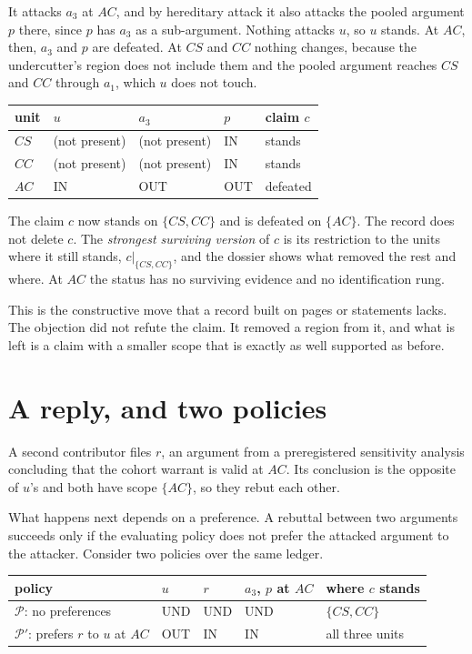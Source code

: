 \documentclass[11pt]{article}
\newcommand{\IN}{\textsf{IN}}
\newcommand{\OUT}{\textsf{OUT}}
\newcommand{\UND}{\textsf{UND}}
\begin{document}
It attacks $a_3$ at $AC$, and by hereditary attack it also attacks the pooled argument $p$ there, since $p$ has $a_3$ as a sub-argument. Nothing attacks $u$, so $u$ stands. At $AC$, then, $a_3$ and $p$ are defeated. At $CS$ and $CC$ nothing changes, because the undercutter's region does not include them and the pooled argument reaches $CS$ and $CC$ through $a_1$, which $u$ does not touch.

\begin{center}
\small
\begin{tabular}{@{}l l l l l@{}}
\toprule
unit & $u$ & $a_3$ & $p$ & claim $c$\\
\midrule
$CS$ & (not present) & (not present) & \IN & stands\\
$CC$ & (not present) & (not present) & \IN & stands\\
$AC$ & \IN & \OUT & \OUT & defeated\\
\bottomrule
\end{tabular}
\end{center}

The claim $c$ now stands on $\{CS,CC\}$ and is defeated on $\{AC\}$. The record does not delete $c$. The \emph{strongest surviving version} of $c$ is its restriction to the units where it still stands, $c|_{\{CS,CC\}}$, and the dossier shows what removed the rest and where. At $AC$ the status has no surviving evidence and no identification rung.

This is the constructive move that a record built on pages or statements lacks. The objection did not refute the claim. It removed a region from it, and what is left is a claim with a smaller scope that is exactly as well supported as before.

\section{A reply, and two policies}\label{sec:reply}

A second contributor files $r$, an argument from a preregistered sensitivity analysis concluding that the cohort warrant is valid at $AC$. Its conclusion is the opposite of $u$'s and both have scope $\{AC\}$, so they rebut each other.

What happens next depends on a preference. A rebuttal between two arguments succeeds only if the evaluating policy does not prefer the attacked argument to the attacker. Consider two policies over the same ledger.

\begin{center}
\small
\begin{tabular}{@{}l l l l l@{}}
\toprule
policy & $u$ & $r$ & $a_3$, $p$ at $AC$ & where $c$ stands\\
\midrule
$\mathcal P$: no preferences & \UND & \UND & \UND & $\{CS,CC\}$\\
$\mathcal P'$: prefers $r$ to $u$ at $AC$ & \OUT & \IN & \IN & all three units\\
\bottomrule
\end{tabular}
\end{center}
\end{document}
